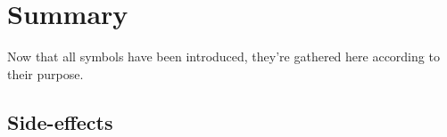 \clearpage %

\section*{Summary}
\label{sec:Appendix/Summary}

Now that all symbols have been introduced, they're gathered here according to their purpose.

\vspace*{-0.4\baselineskip}
\subsection*{Side-effects}
\label{sec:Appendix/Summary/Side-effects}

